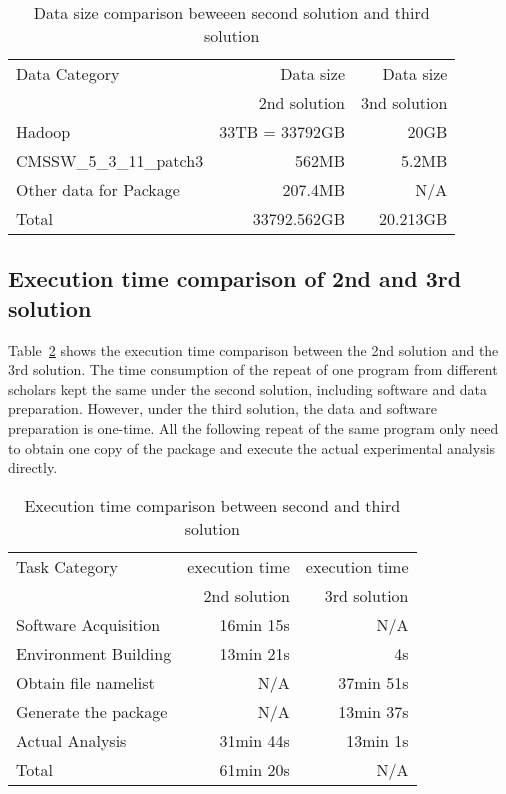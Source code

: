 \documentclass{acm_proc_article-sp}
\begin{document}
\begin{table}
    \centering
    \begin{tabular}{|l|r|r|}
    \hline
     Data Category & Data size & Data size \\
    & 2nd solution & 3nd solution \\ \hline
    Hadoop & 33TB = 33792GB & 20GB \\ \hline
     CMSSW\_5\_3\_11\_patch3 & 562MB & 5.2MB \\ \hline
     Other data for Package & 207.4MB & N/A \\ \hline
     Total & 33792.562GB & 20.213GB \\ \hline
    \end{tabular}
    \caption{Data size comparison beweeen second solution and third solution}
    \label{table:datasize-2nd3rd}
\end{table}

\subsection{Execution time comparison of 2nd and 3rd solution}
Table~\ref{table:time-2nd3rd} shows the execution time comparison between the 2nd solution and the 3rd solution. The time consumption of the repeat of one program from different scholars kept the same under the second solution, including software and data preparation. However, under the third solution, the data and software preparation is one-time. All the following repeat of the same program only need to obtain one copy of the package and execute the actual experimental analysis directly.

\begin{table}
    \centering
    \begin{tabular}{|l|r|r|}
    \hline
    Task Category & execution time & execution time \\
    & 2nd solution & 3rd solution \\ \hline
    Software Acquisition & 16min 15s & N/A \\ \hline
    Environment Building & 13min 21s  & 4s \\ \hline
    Obtain file namelist & N/A & 37min 51s \\ \hline
    Generate the package & N/A & 13min 37s \\ \hline
    Actual Analysis & 31min 44s & 13min 1s \\ \hline
    Total & 61min 20s & N/A \\ \hline
    \end{tabular}
    \caption{Execution time comparison between second and third solution}
    \label{table:time-2nd3rd}
\end{table}    
\end{document}
